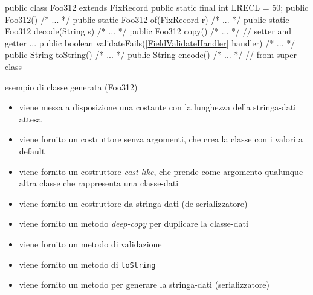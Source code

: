 \documentclass[a4paper,10pt]{report}
\newif\ifesource
\newenvironment{elisting}[1][!htb]
  {\captionsetup{aboveskip=0pt}\begin{listing}[#1]}
  {\end{listing}%
}
\begin{document}
\ifesource
\begin{figure*}[!htb]
\begin{lstlisting}[language=java, caption=esempio di classe generata (Foo312), 
label=lst:Foo312:java]
public class Foo312 extends FixRecord {
    public static final int LRECL = 50;
    public Foo312() { /* ... */ }
    public static Foo312 of(FixRecord r) { /* ... */ }
    public static Foo312 decode(String s) { /* ... */ }
    public Foo312 copy() { /* ... */ }
    // setter and getter ...
    public boolean validateFails((*\hyperref[lst:FieldValidateHandler:java]{FieldValidateHandler}*) handler) { /* ... */ }
    public String toString() { /* ... */ }
    public String encode() { /* ... */ }    // from super class
}
\end{lstlisting}
\end{figure*}
\else
\begin{elisting}
\begin{javacode}
public class Foo312 extends FixRecord {
    public static final int LRECL = 50;
    public Foo312() { /* ... */ }
    public static Foo312 of(FixRecord r) { /* ... */ }
    public static Foo312 decode(String s) { /* ... */ }
    public Foo312 copy() { /* ... */ }
    // setter and getter ...
    public boolean validateFails(|\hyperref[lst:FieldValidateHandler:java]{FieldValidateHandler}| handler) { /* ... */ }
    public String toString() { /* ... */ }
    public String encode() { /* ... */ }    // from super class
}
\end{javacode}
\caption{esempio di classe generata (Foo312)}
\label{lst:Foo312:java}
\end{elisting}
\fi

\begin{itemize}
\item viene messa a disposizione una costante con la lunghezza della 
    stringa-dati attesa
\item viene fornito un costruttore senza argomenti, che crea la classe con i 
    valori a default
\item viene fornito un costruttore \textit{cast-like}, che prende come argomento
    qualunque altra classe che rappresenta una classe-dati
\item viene fornito un costruttore da stringa-dati (de-serializzatore)
\item viene fornito un metodo \textit{deep-copy} per duplicare la classe-dati
\item viene fornito un metodo di validazione
\item viene fornito un metodo di \texttt{toString}
\item viene fornito un metodo per generare la stringa-dati (serializzatore)
\end{itemize}
\end{document}
